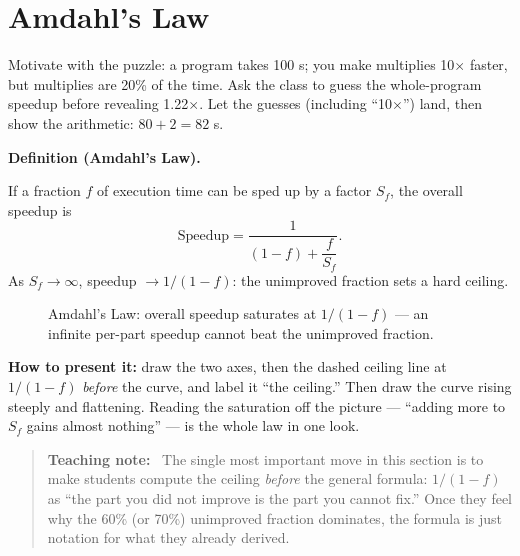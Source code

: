 \documentclass[11pt]{article}
\newenvironment{definitionbox}[1]{%
  \par\noindent\textbf{Definition (#1).}\ \itshape
}{\par\vspace{0.3em}}
\newenvironment{teachingaside}{\begin{quote}\small\color{primary-gold}\textbf{Teaching note:}\ }{\end{quote}}
\begin{document}
\section{Amdahl's Law}

Motivate with the puzzle: a program takes 100 s; you make multiplies 10$\times$ faster, but multiplies are 20\% of the time. Ask the class to guess the whole-program speedup before revealing 1.22$\times$. Let the guesses (including ``10$\times$'') land, then show the arithmetic: $80 + 2 = 82$ s.

\begin{definitionbox}{Amdahl's Law}
If a fraction $f$ of execution time can be sped up by a factor $S_f$, the overall speedup is
\[
  \text{Speedup} = \frac{1}{(1-f) + \dfrac{f}{S_f}}.
\]
As $S_f \to \infty$, speedup $\to 1/(1-f)$: the unimproved fraction sets a hard ceiling.
\end{definitionbox}

\begin{figure}[h]
  \centering
  \caption{Amdahl's Law: overall speedup saturates at $1/(1-f)$ --- an infinite per-part speedup cannot beat the unimproved fraction.}
  \label{fig:amdahl}
\end{figure}

\textbf{How to present it:} draw the two axes, then the dashed ceiling line at $1/(1-f)$ \emph{before} the curve, and label it ``the ceiling.'' Then draw the curve rising steeply and flattening. Reading the saturation off the picture --- ``adding more to $S_f$ gains almost nothing'' --- is the whole law in one look.

\begin{teachingaside}
The single most important move in this section is to make students compute the ceiling \emph{before} the general formula: $1/(1-f)$ as ``the part you did not improve is the part you cannot fix.'' Once they feel why the 60\% (or 70\%) unimproved fraction dominates, the formula is just notation for what they already derived.
\end{teachingaside}
\end{document}
